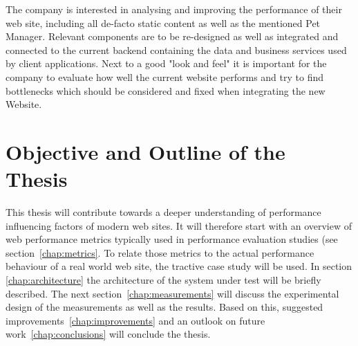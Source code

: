 The company is interested in analysing and improving the performance of their web site, including all de-facto static content as well as the mentioned Pet Manager. Relevant components are to be re-designed as well as integrated and connected to the current backend containing the data and business services used by client applications. Next to a good "look and feel" it is important for the company to evaluate how well the current website performs and try to find bottlenecks which should be considered and fixed when integrating the new Website.     

\section{Objective and Outline of the Thesis}

This thesis will contribute towards a deeper understanding of performance influencing factors of modern web sites.
It will therefore start with an overview of web performance metrics typically used in performance evaluation studies (see section~\ref{chap:metrics}.
To relate those metrics to the actual performance behaviour of a real world web site, the tractive case study will be used. 
In section \ref{chap:architecture} the architecture of the system under test will be briefly described.
The next section~\ref{chap:measurements} will discuss the  experimental design of the measurements as well as the results.
Based on this, suggested improvements~\ref{chap:improvements}  and an outlook on future work~\ref{chap:conclusions} will conclude the thesis. 



